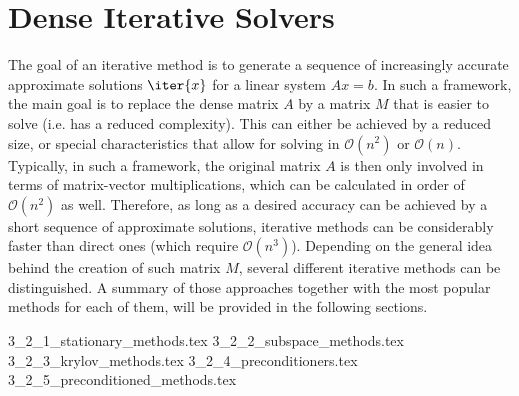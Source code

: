 \section{Dense Iterative Solvers}
\label{sec:iterative_solvers}

The goal of an iterative method is to generate a sequence of increasingly accurate approximate solutions $\iter{x}$ for a linear system $Ax=b$. In such a framework, the main goal is to replace the dense matrix $A$ by a matrix $M$ that is easier to solve (i.e. has a reduced complexity). This can either be achieved by a reduced size, or special characteristics that allow for solving in $\mathcal{O}(n^2)$ or $\mathcal{O}(n)$. Typically, in such a framework, the original matrix $A$ is then only involved in terms of matrix-vector multiplications, which can be calculated in order of $\mathcal{O}(n^2)$ as well. Therefore, as long as a desired accuracy can be achieved by a short sequence of approximate solutions, iterative methods can be considerably faster than direct ones (which require $\mathcal{O}(n^3)$). Depending on the general idea behind the creation of such matrix $M$, several different iterative methods can be distinguished. A summary of those approaches together with the most popular methods for each of them, will be provided in the following sections.

{3_2_1_stationary_methods.tex}
{3_2_2_subspace_methods.tex}
{3_2_3_krylov_methods.tex}
{3_2_4_preconditioners.tex}
{3_2_5_preconditioned_methods.tex}
